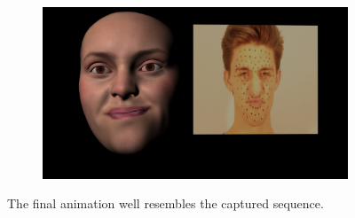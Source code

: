 \begin{figure}
\begin{subfigure}[t]{0.7\textwidth}
        \end{subfigure}
        \begin{subfigure}[t]{0.7\textwidth}
                \includegraphics[width=\textwidth]{img/results/Emily_Maya_clean_video_2135}
        \end{subfigure}
        \caption{The final animation well resembles the captured sequence.}
        \label{fig:results1}
\end{figure}
